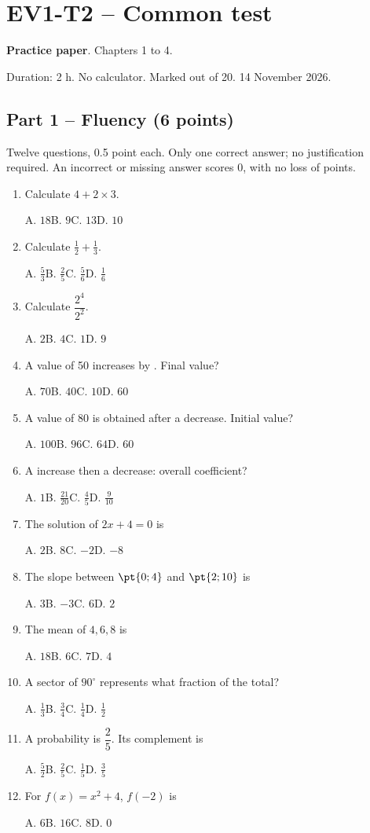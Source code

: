 \mxnewpage\section*{EV1-T2 -- Common test}\label{EV1-T2}
\textbf{Practice paper}. Chapters 1 to 4.\par Duration: 2 h. No calculator. Marked out of 20. 14 November 2026.
\subsection*{Part 1 -- Fluency (6 points)}
Twelve questions, \num{0,5} point each. Only one correct answer; no justification required. An incorrect or missing answer scores 0, with no loss of points.
\begin{enumerate}
\item Calculate $4+2\times3$.\par A. $18$\quad B. $9$\quad C. $13$\quad D. $10$
\item Calculate $\frac12+\frac13$.\par A. $\frac{5}{3}$\quad B. $\frac{2}{5}$\quad C. $\frac{5}{6}$\quad D. $\frac{1}{6}$
\item Calculate $\dfrac{2^4}{2^{2}}$.\par A. $2$\quad B. $4$\quad C. $1$\quad D. $9$
\item A value of 50 increases by . Final value?\par A. $70$\quad B. $40$\quad C. $10$\quad D. $60$
\item A value of 80 is obtained after a  decrease. Initial value?\par A. $100$\quad B. $96$\quad C. $64$\quad D. $60$
\item A  increase then a  decrease: overall coefficient?\par A. $1$\quad B. $\frac{21}{20}$\quad C. $\frac{4}{5}$\quad D. $\frac{9}{10}$
\item The solution of $2x+4=0$ is\par A. $2$\quad B. $8$\quad C. $-2$\quad D. $-8$
\item The slope between $\pt{0;4}$ and $\pt{2;10}$ is\par A. $3$\quad B. $-3$\quad C. $6$\quad D. $2$
\item The mean of $4, 6, 8$ is\par A. $18$\quad B. $6$\quad C. $7$\quad D. $4$
\item A sector of $90^\circ$ represents what fraction of the total?\par A. $\frac{1}{3}$\quad B. $\frac{3}{4}$\quad C. $\frac{1}{4}$\quad D. $\frac{1}{2}$
\item A probability is $\dfrac{2}{5}$. Its complement is\par A. $\frac{5}{2}$\quad B. $\frac{2}{5}$\quad C. $\frac{1}{5}$\quad D. $\frac{3}{5}$
\item For $f(x)=x^2+4$, $f(-2)$ is\par A. $6$\quad B. $16$\quad C. $8$\quad D. $0$
\end{enumerate}
